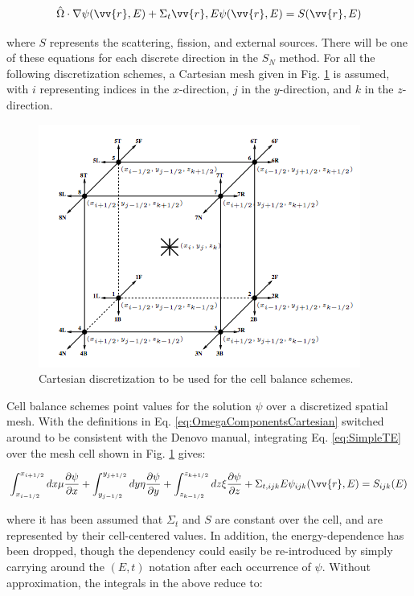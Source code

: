 \documentclass[10pt]{article}
\newcounter{subsubsubsection}[subsubsection]
\begin{document}
\begin{flushleft}
\begin{equation}
\label{eq:SimpleTE}
\hat{\Omega}\cdot\nabla\psi(\vv{r},E)+\Sigma_t{\vv{r},E}\psi(\vv{r},E)=S(\vv{r},E)
\end{equation}

where \(S\) represents the scattering, fission, and external sources. There will be one of these equations for each discrete direction in the \(S_N\) method. For all the following discretization schemes, a Cartesian mesh given in Fig. \ref{fig:CartesianDiscretization} is assumed, with \(i\) representing indices in the \(x\)-direction, \(j\) in the \(y\)-direction, and \(k\) in the \(z\)-direction.

\begin{figure}[H]
\centering
\includegraphics[width=0.6\linewidth]{figures/CartesianDiscretization.jpg}
\caption{Cartesian discretization to be used for the cell balance schemes.}
\label{fig:CartesianDiscretization}
\end{figure}


Cell balance schemes point values for the solution \(\psi\) over a discretized spatial mesh. With the definitions in Eq. \eqref{eq:OmegaComponentsCartesian} switched around to be consistent with the Denovo manual, integrating Eq. \eqref{eq:SimpleTE} over the mesh cell shown in Fig. \ref{fig:CartesianDiscretization} gives:

\begin{equation}
\int_{x_{i-1/2}}^{x_{i+1/2}}dx\mu \frac{\partial \psi}{\partial x}+\int_{y_{j-1/2}}^{y_{j+1/2}}dy\eta \frac{\partial \psi}{\partial y}+\int_{z_{k-1/2}}^{z_{k+1/2}}dz\xi \frac{\partial \psi}{\partial z}+\Sigma_{t,ijk}{E}\psi_{ijk}(\vv{r},E)=S_{ijk}(E)
\end{equation}

where it has been assumed that \(\Sigma_t\) and \(S\) are constant over the cell, and are represented by their cell-centered values. In addition, the energy-dependence has been dropped, though the dependency could easily be re-introduced by simply carrying around the \((E, t)\) notation after each occurrence of \(\psi\). Without approximation, the integrals in the above reduce to:


\end{flushleft}
\end{document}
